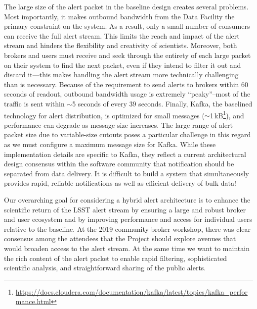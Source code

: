 \documentclass[DM,authoryear,toc]{lsstdoc}
\begin{document}
The large size of the alert packet in the baseline design creates several problems.
Most importantly, it makes outbound bandwidth from the Data Facility the primary constraint on the system.
As a result, only a small number of consumers can receive the full alert stream.
This limits the reach and impact of the alert stream and hinders the flexibility and creativity of scientists.
Moreover, both brokers and users must receive and seek through the entirety of each large packet on their system to find the next packet, even if they intend to filter it out and discard it---this makes handling the alert stream more technically challenging than is necessary.
Because of the requirement to send alerts to brokers within 60 seconds of readout, outbound bandwidth usage is extremely ``peaky''--most of the traffic is sent within $\sim$5 seconds of every 39 seconds.
Finally, Kafka, the baselined technology for alert distribution, is optimized for small messages ($\sim$1\,kB\footnote{\url{https://docs.cloudera.com/documentation/kafka/latest/topics/kafka_performance.html}}), and performance can degrade as message size increases.
The large range of alert packet size due to variable-size cutouts poses a particular challenge in this regard as we must configure a maximum message size for Kafka.
While these implementation details are specific to Kafka, they reflect a current architectural design consensus within the software community that notification should be separated from data delivery.
It is difficult to build a system that simultaneously provides rapid, reliable notifications as well as efficient delivery of bulk data!

Our overarching goal for considering a hybrid alert architecture is to enhance the scientific return of the LSST alert stream by ensuring a large and robust broker and user ecosystem and by improving performance and access for individual users relative to the baseline.
At the 2019 community broker workshop, there was clear consensus among the attendees that the Project should explore avenues that would broaden access to the alert stream.
At the same time we want to maintain the rich content of the alert packet to enable rapid filtering, sophisticated scientific analysis, and straightforward sharing of the public alerts.

\end{document}
